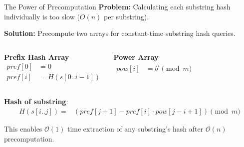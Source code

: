 \documentclass{beamer}
\begin{document}
\begin{frame}{The Power of Precomputation}
    \textbf{Problem:} Calculating each substring hash individually is too slow ($O(n)$ per substring).

    \textbf{Solution:} Precompute two arrays for constant-time substring hash queries.

    \vspace{5pt}
    \begin{columns}
        \textbf{Prefix Hash Array}
        \begin{align*}
            pref[0] &= 0\\
            pref[i] &= H(s[0..i-1])
        \end{align*}

        \textbf{Power Array}
        \begin{align*}
            pow[i] &= b^i \pmod{m}
        \end{align*}
    \end{columns}

    \vspace{5pt}
    \textbf{Hash of substring}:
    \begin{align*}
        H(s[i..j]) = &\left(pref[j+1] - pref[i] \cdot pow[j - i + 1]\right) \pmod{m}
    \end{align*}
    \vspace{-5pt}
    \begin{block}{}
        This enables \alert{$\mathcal{O}(1)$} time extraction of any substring's hash after \alert{$\mathcal{O}(n)$} precomputation.
    \end{block}
\end{frame}
\end{document}
